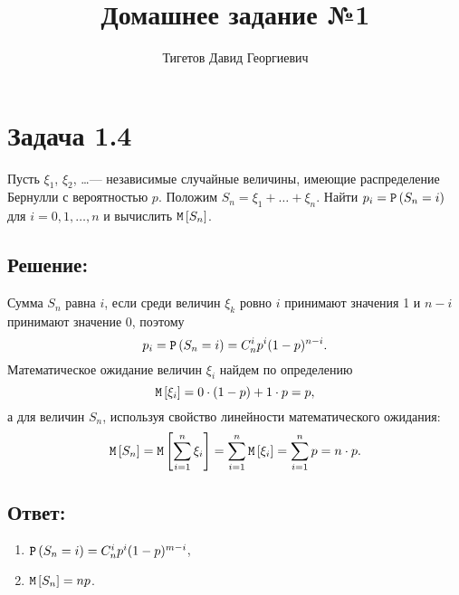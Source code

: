 \documentclass[12pt]{article}
\begin{document}
    \title{Домашнее задание №1}
    \author{Тигетов Давид Георгиевич}
    \date{}
    \maketitle

    \section*{Задача 1.4}
    Пусть $\xi_1$, $\xi_2$, \dots --- независимые случайные величины, имеющие распределение Бернулли с вероятностью $p$. Положим $S_n = \xi_1 + \dots + \xi_n$. Найти $p_i = \mathtt{P} \left ( S_n = i \right )$
    для $i = 0, 1, \dots, n$ и вычислить $\mathtt{M} \left [ S_n \right ]$.

    \subsection*{Решение:}
    Сумма $S_n$ равна $i$, если среди величин $\xi_k$ ровно $i$ принимают значения 1 и $n-i$ принимают значение 0, поэтому
    \[
        p_i
        = \mathtt{P} \left ( S_n = i \right )
        = C_n^i p^i (1-p)^{n-i}
        .
    \]
    Математическое ожидание величин $\xi_i$ найдем по определению
    \[
        \mathtt{M} \left [ \xi_i \right ] = 0 \cdot (1-p) + 1 \cdot p = p,
    \]
    а для величин $S_n$, используя свойство линейности математического ожидания:
    \[
        \mathtt{M} \left [ S_n \right ]
        = \mathtt{M} \left [ \sum_{i=1}^n \xi_i \right ]
        = \sum_{i=1}^n \mathtt{M} \left [ \xi_i \right ]
        = \sum_{i=1}^n p
        = n \cdot p
        .
    \]

    \subsection*{Ответ:}
    \begin{enumerate}
        \item $\mathtt{P} \left ( S_n = i \right ) = C_n^i p^i (1-p)^{m-i}$,
        \item $\mathtt{M} \left [ S_n \right ] = n p$.
    \end{enumerate}
\end{document}

